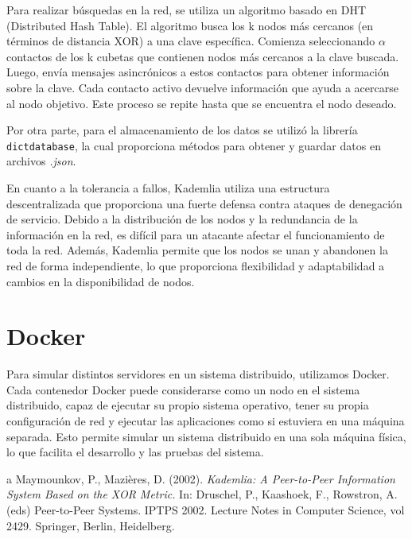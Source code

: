 \documentclass[10pt]{article} %
\begin{document}
	Para realizar búsquedas en la red, se utiliza un algoritmo basado en DHT (Distributed Hash Table). El algoritmo busca los k nodos más cercanos (en términos de distancia XOR) a una clave específica. Comienza seleccionando $\alpha$ contactos de los k cubetas que contienen nodos más cercanos a la clave buscada. Luego, envía mensajes asincrónicos a estos contactos para obtener información sobre la clave. Cada contacto activo devuelve información que ayuda a acercarse al nodo objetivo. Este proceso se repite hasta que se encuentra el nodo deseado.	
	 
	 Por otra parte, para el almacenamiento de los datos se utiliz\'o la librer\'ia \texttt{dictdatabase}, la cual proporciona m\'etodos para obtener y guardar datos en archivos \textit{.json}.
		
	En cuanto a la tolerancia a fallos, Kademlia utiliza una estructura descentralizada que proporciona una fuerte defensa contra ataques de denegación de servicio. Debido a la distribución de los nodos y la redundancia de la información en la red, es difícil para un atacante afectar el funcionamiento de toda la red. Además, Kademlia permite que los nodos se unan y abandonen la red de forma independiente, lo que proporciona flexibilidad y adaptabilidad a cambios en la disponibilidad de nodos.
	
	
	
	\section{Docker}
	
	Para simular distintos servidores en un sistema distribuido, utilizamos Docker. Cada contenedor Docker puede considerarse como un nodo en el sistema distribuido, capaz de ejecutar su propio sistema operativo, tener su propia configuración de red y ejecutar las aplicaciones como si estuviera en una máquina separada. Esto permite simular un sistema distribuido en una sola máquina física, lo que facilita el desarrollo y las pruebas del sistema.
	

	
	\begin{thebibliography}
		a
		 Maymounkov, P., Mazières, D. (2002). \textit{Kademlia: A Peer-to-Peer Information System Based on the XOR Metric.} In: Druschel, P., Kaashoek, F., Rowstron, A. (eds) Peer-to-Peer Systems. IPTPS 2002. Lecture Notes in Computer Science, vol 2429. Springer, Berlin, Heidelberg.
	\end{thebibliography}
\end{document}
